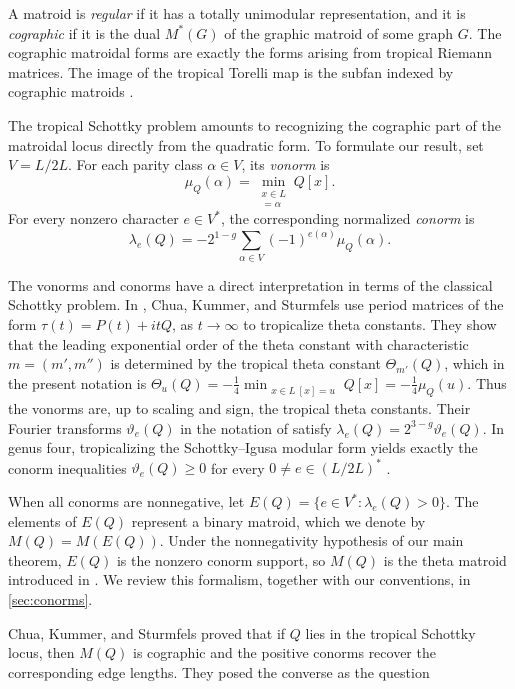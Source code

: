 \documentclass[11pt,letterpaper]{amsart}
\begin{document}
A matroid is \emph{regular} if it has a totally unimodular
representation, and it is \emph{cographic} if it is the dual
$M^*(G)$ of the graphic matroid of some graph $G$. The cographic matroidal forms are
exactly the forms arising from tropical Riemann matrices. The image of the tropical Torelli map is the subfan indexed by cographic matroids
\cite[Theorem~5.2.4]{brannetti2011torelli}.



The tropical Schottky problem amounts to recognizing the
cographic part of the matroidal locus directly from the quadratic
form. To formulate our result, set $V=L/2L.$ For each parity class $\alpha\in V$, its \emph{vonorm} is
\[
    \mu_Q(\alpha)
    =
    \min_{\substack{x\in L\\ [x]=\alpha}} Q[x].
\]
For every nonzero character $e\in V^*$, the corresponding normalized \emph{conorm} is
\[
    \lambda_e(Q)
    =
    -2^{1-g}
    \sum_{\alpha\in V}
    (-1)^{e(\alpha)}\mu_Q(\alpha).
\]

The vonorms and conorms have a direct interpretation in terms of the classical Schottky problem. In \cite{chua2019schottky}, Chua, Kummer, and Sturmfels use period matrices of the form
$\tau(t)=P(t)+itQ$, as $t\longrightarrow\infty$ to tropicalize theta constants. They show that the leading exponential order of the theta constant with characteristic $m=(m',m'')$ is determined by the tropical theta constant $\Theta_{m'}(Q)$, which in the present notation is
$\Theta_u(Q)
=
-\frac14\min_{\substack{x\in L\ [x]=u}}Q[x]
=
-\frac14\mu_Q(u)$. Thus the vonorms are, up to scaling and sign, the tropical theta constants. Their Fourier transforms $\vartheta_e(Q)$ in the notation of \cite{chua2019schottky} satisfy
$\lambda_e(Q)=2^{3-g}\vartheta_e(Q).$ In genus four, tropicalizing the Schottky--Igusa modular form yields exactly the conorm inequalities $\vartheta_e(Q)\geq0$ for every $0\neq e\in(L/2L)^*$ \cite[Theorem~4.9]{chua2019schottky}.


When all conorms are nonnegative, let $E(Q)=\{e\in V^*:\lambda_e(Q)>0\}.$ The elements of $E(Q)$ represent a binary matroid, which we denote by $M(Q)=M(E(Q)).$
Under the nonnegativity hypothesis of our main theorem, $E(Q)$ is the nonzero conorm support, so $M(Q)$ is the theta matroid introduced in \cite{chua2019schottky}. We review this formalism, together with our  conventions, in \cref{sec:conorms}.

Chua, Kummer, and Sturmfels proved that if $Q$ lies in the tropical Schottky locus, then $M(Q)$ is cographic and the positive conorms recover the corresponding edge lengths. They posed the converse as the question
\end{document}
